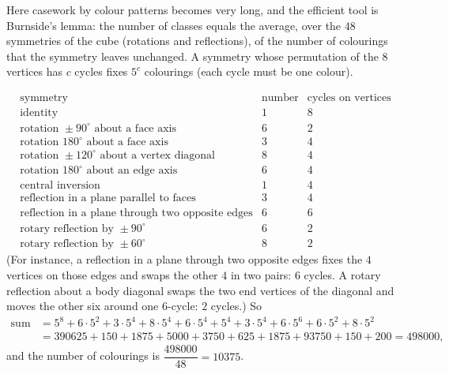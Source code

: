 Here casework by colour patterns becomes very long, and the efficient tool is Burnside's lemma: the number of classes equals the average, over the $48$ symmetries of the cube (rotations and reflections), of the number of colourings that the symmetry leaves unchanged. A symmetry whose permutation of the $8$ vertices has $c$ cycles fixes $5^c$ colourings (each cycle must be one colour).

\[
\begin{array}{lcc}
\text{symmetry}&\text{number}&\text{cycles on vertices}\\\hline
\text{identity}&1&8\\
\text{rotation }\pm90^\circ\text{ about a face axis}&6&2\\
\text{rotation }180^\circ\text{ about a face axis}&3&4\\
\text{rotation }\pm120^\circ\text{ about a vertex diagonal}&8&4\\
\text{rotation }180^\circ\text{ about an edge axis}&6&4\\
\text{central inversion}&1&4\\
\text{reflection in a plane parallel to faces}&3&4\\
\text{reflection in a plane through two opposite edges}&6&6\\
\text{rotary reflection by }\pm90^\circ&6&2\\
\text{rotary reflection by }\pm60^\circ&8&2
\end{array}
\]
(For instance, a reflection in a plane through two opposite edges fixes the $4$ vertices on those edges and swaps the other $4$ in two pairs: $6$ cycles. A rotary reflection about a body diagonal swaps the two end vertices of the diagonal and moves the other six around one $6$-cycle: $2$ cycles.) So
\[
\begin{aligned}
\text{sum}&=5^8+6\cdot5^2+3\cdot5^4+8\cdot5^4+6\cdot5^4+5^4+3\cdot5^4+6\cdot5^6+6\cdot5^2+8\cdot5^2\\
&=390625+150+1875+5000+3750+625+1875+93750+150+200=498000,
\end{aligned}
\]
and the number of colourings is $\dfrac{498000}{48}=\boxed{10375}$.
